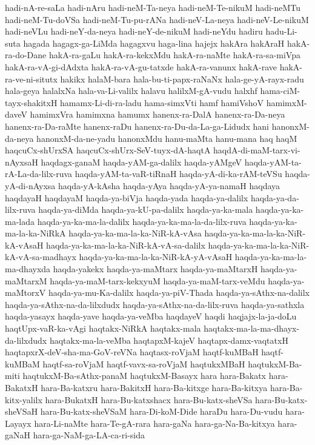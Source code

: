 {hadi-nA-re-saLa
hadi-nAru
hadi-neM-Ta-neya
hadi-neM-Te-nikuM
hadi-neMTu
hadi-neM-Tu-doVSa
hadi-neM-Tu-pu-rANa
hadi-neV-La-neya
hadi-neV-Le-nikuM
hadi-neVLu
hadi-neY-da-neya
hadi-neY-de-nikuM
hadi-neYdu
hadiru
hadu-Li-suta
hagada
hagagx-ga-LiMda
hagagxvu
haga-lina
hajejx
hakAra
hakAraH
hakA-ra-do-Dane
hakA-ra-gaLu
hakA-ra-kekxMdu
hakA-ra-naMte
hakA-ra-sa-miVpa
hakA-ra-vA-gi-dAdxta
hakA-ra-vA-gu-tatxde
hakA-ra-vanunx
hakA-rave
hakA-ra-ve-ni-situtx
hakikx
halaM-bara
hala-bu-ti-papx-raNaNx
hala-ge-yA-rayx-radu
hala-geya
halalxNa
hala-va-Li-valilx
halavu
halilxM-gA-vudu
halxhf
hama-ciM-tayx-shakitxH
hamamx-Li-di-ra-ladu
hama-simxVti
hamf
hamiVshoV
hamimxM-daveV
hamimxVra
hamimxna
hamumx
hanenx-ra-DalA
hanenx-ra-Da-neya
hanenx-ra-Da-raMte
hanenx-raDu
hanenx-ra-Du-da-La-ga-Lidudx
hani
hanonxM-da-neya
hanonxM-da-ne-yadu
hanonxMdu
hanu-maMta
hanu-mana
haq
haqM
haqcuCx-shUrxSA
haqcuCx-shUrx-SeV-tuyx-dA-haqtA
haqdA-di-maM-tarx-vi-nAyxsaH
haqdagx-ganaM
haqda-yAM-ga-dalilx
haqda-yAMgeV
haqda-yAM-ta-rA-La-da-lilx-ruva
haqda-yAM-ta-vaR-tiRnaH
haqda-yA-di-ka-rAM-teVSu
haqda-yA-di-nAyxsa
haqda-yA-kAsha
haqda-yAya
haqda-yA-ya-namaH
haqdaya
haqdayaH
haqdayaM
haqda-ya-biVja
haqda-yada
haqda-ya-dalilx
haqda-ya-da-lilx-ruva
haqda-ya-diMda
haqda-ya-kU-pa-dalilx
haqda-ya-ka-mala
haqda-ya-ka-ma-lada
haqda-ya-ka-ma-la-dalilx
haqda-ya-ka-ma-la-da-lilx-ruva
haqda-ya-ka-ma-la-ka-NiRkA
haqda-ya-ka-ma-la-ka-NiR-kA-vAsa
haqda-ya-ka-ma-la-ka-NiR-kA-vAsaH
haqda-ya-ka-ma-la-ka-NiR-kA-vA-sa-dalilx
haqda-ya-ka-ma-la-ka-NiR-kA-vA-sa-madhayx
haqda-ya-ka-ma-la-ka-NiR-kA-yA-vAsaH
haqda-ya-ka-ma-la-ma-dhayxda
haqda-yakekx
haqda-ya-maMtarx
haqda-ya-maMtarxH
haqda-ya-maMtarxM
haqda-ya-maM-tarx-kekxyuM
haqda-ya-maM-tarx-veMdu
haqda-ya-maMtorxV
haqda-ya-mu-Ka-dalilx
haqda-ya-piV-Thada
haqda-ya-sAthx-na-dalilx
haqda-ya-sAthx-na-da-lilxdudx
haqda-ya-sAthx-na-da-lilx-ruva
haqda-ya-sathxla
haqda-yasayx
haqda-yave
haqda-ya-veMba
haqdayeV
haqdi
haqjajx-la-ja-doLu
haqtUpx-vaR-ka-vAgi
haqtakx-NiRkA
haqtakx-mala
haqtakx-ma-la-ma-dhayx-da-lilxdudx
haqtakx-ma-la-veMba
haqtapxM-kajeV
haqtapx-damx-vaqtatxH
haqtapxrX-deV-sha-ma-GoV-reVNa
haqtasx-roVjaM
haqtf-kuMBaH
haqtf-kuMBaM
haqtf-sa-roVjaM
haqtf-vavx-sa-roVjaM
haqtukxMBaH
haqtukxM-Ba-miti
haqtukxM-Ba-sAthx-panaM
haqtukxM-Basayx
hara
hara-Bakatx
hara-BakatxH
hara-Ba-katxru
hara-BakitxH
hara-Ba-kitxge
hara-Ba-kitxya
hara-Ba-kitx-yalilx
hara-BukatxH
hara-Bu-katxshacx
hara-Bu-katx-sheVSa
hara-Bu-katx-sheVSaH
hara-Bu-katx-sheVSaM
hara-Di-koM-Dide
haraDu
hara-Du-vudu
hara-Layayx
hara-Li-naMte
hara-Te-gA-rara
hara-gaNa
hara-ga-Na-Ba-kitxya
hara-gaNaH
hara-ga-NaM-ga-LA-ca-ri-sida
}
